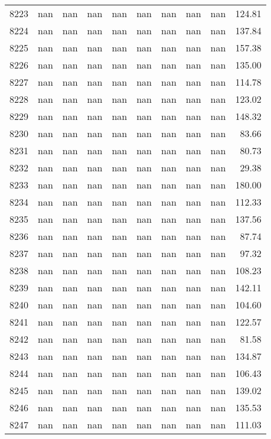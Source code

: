 \begin{tabular}{lrrrrrrrrr}
8223 & nan & nan & nan & nan & nan & nan & nan & nan & 124.81 \\
8224 & nan & nan & nan & nan & nan & nan & nan & nan & 137.84 \\
8225 & nan & nan & nan & nan & nan & nan & nan & nan & 157.38 \\
8226 & nan & nan & nan & nan & nan & nan & nan & nan & 135.00 \\
8227 & nan & nan & nan & nan & nan & nan & nan & nan & 114.78 \\
8228 & nan & nan & nan & nan & nan & nan & nan & nan & 123.02 \\
8229 & nan & nan & nan & nan & nan & nan & nan & nan & 148.32 \\
8230 & nan & nan & nan & nan & nan & nan & nan & nan & 83.66 \\
8231 & nan & nan & nan & nan & nan & nan & nan & nan & 80.73 \\
8232 & nan & nan & nan & nan & nan & nan & nan & nan & 29.38 \\
8233 & nan & nan & nan & nan & nan & nan & nan & nan & 180.00 \\
8234 & nan & nan & nan & nan & nan & nan & nan & nan & 112.33 \\
8235 & nan & nan & nan & nan & nan & nan & nan & nan & 137.56 \\
8236 & nan & nan & nan & nan & nan & nan & nan & nan & 87.74 \\
8237 & nan & nan & nan & nan & nan & nan & nan & nan & 97.32 \\
8238 & nan & nan & nan & nan & nan & nan & nan & nan & 108.23 \\
8239 & nan & nan & nan & nan & nan & nan & nan & nan & 142.11 \\
8240 & nan & nan & nan & nan & nan & nan & nan & nan & 104.60 \\
8241 & nan & nan & nan & nan & nan & nan & nan & nan & 122.57 \\
8242 & nan & nan & nan & nan & nan & nan & nan & nan & 81.58 \\
8243 & nan & nan & nan & nan & nan & nan & nan & nan & 134.87 \\
8244 & nan & nan & nan & nan & nan & nan & nan & nan & 106.43 \\
8245 & nan & nan & nan & nan & nan & nan & nan & nan & 139.02 \\
8246 & nan & nan & nan & nan & nan & nan & nan & nan & 135.53 \\
8247 & nan & nan & nan & nan & nan & nan & nan & nan & 111.03 \\

\end{tabular}
